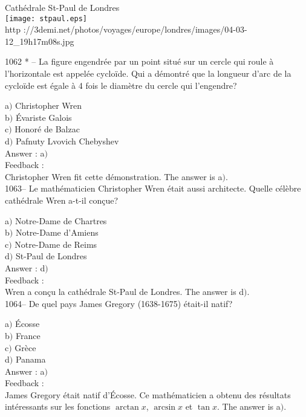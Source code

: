 ﻿\documentclass[letterpaper, 12pt]{article}
\begin{document}
        \begin{center}
        Cath\'edrale St-Paul de Londres\\
    \texttt{[image: stpaul.eps]}\\
        {\footnotesize http
://3demi.net/photos/voyages/europe/londres/images/04-03-12\_19h17m08s.jpg}
    \end{center}

1062 * -- La figure engendr\'ee par un point situ\'e sur un cercle
qui roule \`a l'horizontale est appel\'ee cyclo\"ide. Qui a
d\'emontr\'e que la longueur d'arc de la cyclo\"ide est \'egale \`a
4 fois le diam\`etre du cercle qui l'engendre?

a$)$ Christopher Wren\\
b$)$ \'Evariste Galois \\
c$)$ Honor\'e de Balzac \\
d$)$ Pafnuty Lvovich Chebyshev\\

Answer : a$)$\\

Feedback : \\
Christopher Wren fit cette d\'emonstration.
The answer is a$)$.\\

1063-- Le math\'ematicien Christopher Wren \'etait aussi architecte.
Quelle c\'el\`ebre cath\'edrale Wren a-t-il con\c cue?

a$)$ Notre-Dame de Chartres  \\
b$)$ Notre-Dame d'Amiens \\
c$)$ Notre-Dame de Reims \\
d$)$ St-Paul de Londres \\

Answer : d$)$\\

Feedback : \\
Wren a con\c cu la cath\'edrale St-Paul de Londres.
The answer is d$)$.\\

1064-- De quel pays James Gregory (1638-1675) \'etait-il natif?

a$)$ \'Ecosse \\
b$)$ France  \\
c$)$ Gr\`ece  \\
d$)$ Panama \\

Answer : a$)$ \\

Feedback : \\
James Gregory \'etait natif d'\'Ecosse. Ce math\'ematicien a obtenu
des r\'esultats int\'eressants sur les fonctions $\arctan x$,
$\arcsin x$ et $\tan x$.
The answer is a$)$.\\
\end{document}
